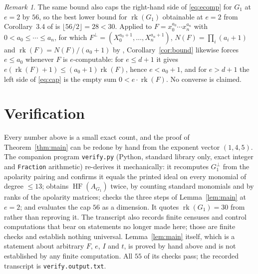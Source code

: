 \documentclass[11pt]{amsart}
\theoremstyle{remark}
\newtheorem*{remark}{Remark}
\theoremstyle{definition}
\DeclareMathOperator{\rk}{rk}
\DeclareMathOperator{\HF}{HF}
\newcommand{\perpp}{^{\perp}}
\begin{document}
\begin{remark}
The same bound also caps the right-hand side of \eqref{eq:ecomp} for $G_1$ at $e=2$ by $56$, so
the best lower bound for $\rk(G_1)$ obtainable at $e=2$ from Corollary~3.4 of \cite{CCCGW} is
$\lfloor56/2\rfloor=28<30$. Applied to $F=x_0^{a_0}\cdots x_n^{a_n}$ with
$0<a_0\le\cdots\le a_n$, for which $F\perpp=(X_0^{a_0+1},\dots,X_n^{a_n+1})$,
$N(F)=\prod_i(a_i+1)$ and $\rk(F)=N(F)/(a_0+1)$ by \cite{CCG}, Corollary~\ref{cor:bound}
likewise forces $e\le a_0$ whenever $F$ is $e$-computable: for $e\le d+1$ it gives
$e(\rk(F)+1)\le(a_0+1)\rk(F)$, hence $e<a_0+1$, and for $e>d+1$ the left side of \eqref{eq:cap}
is the empty sum $0<e\cdot\rk(F)$. No converse is claimed.
\end{remark}

\section{Verification}

Every number above is a small exact count, and the proof of Theorem~\ref{thm:main} can be redone
by hand from the exponent vector $(1,4,5)$. The companion program \texttt{verify.py} (Python,
standard library only, exact integer and \texttt{Fraction} arithmetic) re-derives it
mechanically: it recomputes $G_1\perpp$ from the apolarity pairing and confirms it equals the
printed ideal on every monomial of degree $\le13$; obtains $\HF(A_{G_1})$ twice, by counting
standard monomials and by ranks of the apolarity matrices; checks the three steps of
Lemma~\ref{lem:main} at $e=2$; and evaluates the cap $56$ as a dimension. It quotes
$\rk(G_1)=30$ from \cite{CCG} rather than reproving it. The transcript also records finite
censuses and control computations that bear on statements no longer made here; those are finite
checks and establish nothing universal. Lemma~\ref{lem:main} itself, which is a statement about
arbitrary $F$, $e$, $I$ and $t$, is proved by hand above and is not established by any finite
computation. All $55$ of its checks pass; the recorded transcript is
\texttt{verify.output.txt}.
\end{document}
